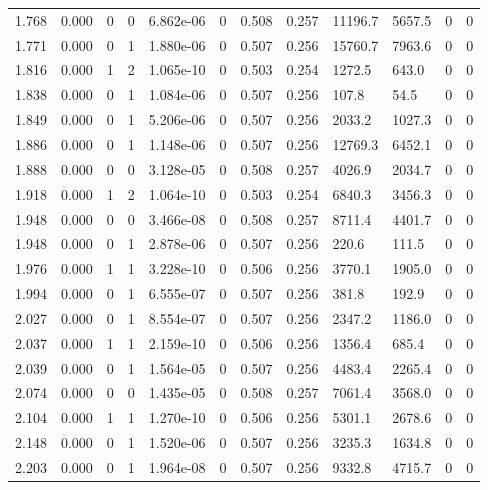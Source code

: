 \documentclass[preview]{standalone}
\begin{document}
{{{\begin{tabular}{L{1.2cm}C{1.2cm} C{0.3cm}C{0.5cm} C{1.4cm}C{1.4cm} C{1.4cm}C{1.4cm} C{1.6cm}C{1.6cm} C{1.6cm}C{1.6cm}}
  1.768  &  0.000  & 0     &  0 &  6.862e-06  & 0  &  0.508&   0.257& 11196.7 & 5657.5   &  0 & 0  \\ 
  1.771  &  0.000  & 0     &  1 &  1.880e-06  & 0  &  0.507&   0.256& 15760.7 & 7963.6   &  0 & 0  \\ 
  1.816  &  0.000  & 1     &  2 &  1.065e-10  & 0  &  0.503&   0.254& 1272.5 & 643.0   &  0 & 0  \\ 
  1.838  &  0.000  & 0     &  1 &  1.084e-06  & 0  &  0.507&   0.256& 107.8 & 54.5   &  0 & 0  \\ 
  1.849  &  0.000  & 0     &  1 &  5.206e-06  & 0  &  0.507&   0.256& 2033.2 & 1027.3   &  0 & 0  \\ 
  1.886  &  0.000  & 0     &  1 &  1.148e-06  & 0  &  0.507&   0.256& 12769.3 & 6452.1   &  0 & 0  \\ 
  1.888  &  0.000  & 0     &  0 &  3.128e-05  & 0  &  0.508&   0.257& 4026.9 & 2034.7   &  0 & 0  \\ 
  1.918  &  0.000  & 1     &  2 &  1.064e-10  & 0  &  0.503&   0.254& 6840.3 & 3456.3   &  0 & 0  \\ 
  1.948  &  0.000  & 0     &  0 &  3.466e-08  & 0  &  0.508&   0.257& 8711.4 & 4401.7   &  0 & 0  \\ 
  1.948  &  0.000  & 0     &  1 &  2.878e-06  & 0  &  0.507&   0.256& 220.6 & 111.5   &  0 & 0  \\ 
  1.976  &  0.000  & 1     &  1 &  3.228e-10  & 0  &  0.506&   0.256& 3770.1 & 1905.0   &  0 & 0  \\ 
  1.994  &  0.000  & 0     &  1 &  6.555e-07  & 0  &  0.507&   0.256& 381.8 & 192.9   &  0 & 0  \\ 
  2.027  &  0.000  & 0     &  1 &  8.554e-07  & 0  &  0.507&   0.256& 2347.2 & 1186.0   &  0 & 0  \\ 
  2.037  &  0.000  & 1     &  1 &  2.159e-10  & 0  &  0.506&   0.256& 1356.4 & 685.4   &  0 & 0  \\ 
  2.039  &  0.000  & 0     &  1 &  1.564e-05  & 0  &  0.507&   0.256& 4483.4 & 2265.4   &  0 & 0  \\ 
  2.074  &  0.000  & 0     &  0 &  1.435e-05  & 0  &  0.508&   0.257& 7061.4 & 3568.0   &  0 & 0  \\ 
  2.104  &  0.000  & 1     &  1 &  1.270e-10  & 0  &  0.506&   0.256& 5301.1 & 2678.6   &  0 & 0  \\ 
  2.148  &  0.000  & 0     &  1 &  1.520e-06  & 0  &  0.507&   0.256& 3235.3 & 1634.8   &  0 & 0  \\ 
  2.203  &  0.000  & 0     &  1 &  1.964e-08  & 0  &  0.507&   0.256& 9332.8 & 4715.7   &  0 & 0  \\ 

\end{tabular}}}}
\end{document}
